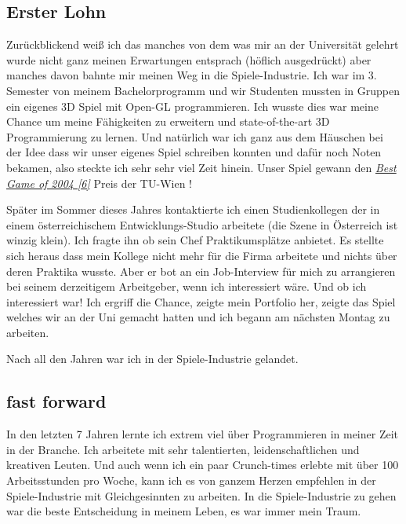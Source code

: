 \subsection*{Erster Lohn}

Zurückblickend weiß ich das manches von dem was mir an der Universität gelehrt wurde nicht ganz meinen Erwartungen entsprach (höflich ausgedrückt) aber manches davon bahnte mir meinen Weg in die Spiele-Industrie. Ich war im 3. Semester von meinem Bachelorprogramm und wir Studenten mussten in Gruppen ein eigenes 3D Spiel mit Open-GL programmieren. Ich wusste dies war meine Chance um meine Fähigkeiten zu erweitern und state-of-the-art 3D Programmierung zu lernen. Und natürlich war ich ganz aus dem Häuschen bei der Idee dass wir unser eigenes Spiel schreiben konnten und dafür noch Noten bekamen, also steckte ich sehr sehr viel Zeit hinein. Unser Spiel gewann den \href{http://www.cg.tuwien.ac.at/courses/CG23/HallOfFame/2004/}{\textit{Best Game of 2004 [6]}} Preis der TU-Wien !

Später im Sommer dieses Jahres kontaktierte ich einen Studienkollegen der in einem österreichischem Entwicklungs-Studio arbeitete (die Szene in Österreich ist winzig klein). Ich fragte ihn ob sein Chef Praktikumsplätze anbietet. Es stellte sich heraus dass mein Kollege nicht mehr für die Firma arbeitete und nichts über deren Praktika wusste. Aber er bot an ein Job-Interview für mich zu arrangieren bei seinem derzeitigem Arbeitgeber, wenn ich interessiert wäre. Und ob ich interessiert war! Ich ergriff die Chance, zeigte mein Portfolio her, zeigte das Spiel welches wir an der Uni gemacht hatten und ich begann am nächsten Montag zu arbeiten.

Nach all den Jahren war ich in der Spiele-Industrie gelandet.

\subsection*{fast forward}

In den letzten 7 Jahren lernte ich extrem viel über Programmieren in meiner Zeit in der Branche. Ich arbeitete mit sehr talentierten, leidenschaftlichen und kreativen Leuten. Und auch wenn ich ein paar Crunch-times erlebte mit über 100 Arbeitsstunden pro Woche, kann ich es von ganzem Herzen empfehlen in der Spiele-Industrie mit Gleichgesinnten zu arbeiten. In die Spiele-Industrie zu gehen war die beste Entscheidung in meinem Leben, es war immer mein Traum.\\

